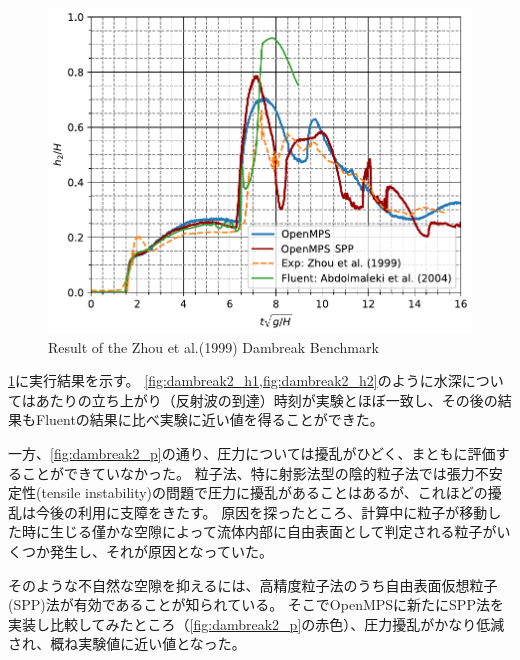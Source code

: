 \begin{figure}
\begin{minipage}{.3 \linewidth}
			\end{minipage}
			\begin{minipage}{.3 \linewidth} \centering
				\includegraphics[clip, width=\linewidth]{img/zhouetal1999_h2_2mm.pdf}
			\end{minipage}
			\caption{Result of the Zhou et al.(1999) Dambreak Benchmark \label{fig:result_dambreak2}}
		\end{figure}
		\cref{fig:result_dambreak2}に実行結果を示す。
		\cref{fig:dambreak2_h1,fig:dambreak2_h2}のように水深についてはあたりの立ち上がり（反射波の到達）時刻が実験とほぼ一致し、その後の結果もFluentの結果に比べ実験に近い値を得ることができた。

		一方、\cref{fig:dambreak2_p}の通り、圧力については擾乱がひどく、まともに評価することができていなかった。		
		粒子法、特に射影法型の陰的粒子法では張力不安定性(tensile instability)の問題で圧力に擾乱があることはあるが、これほどの擾乱は今後の利用に支障をきたす。
		原因を探ったところ、計算中に粒子が移動した時に生じる僅かな空隙によって流体内部に自由表面として判定される粒子がいくつか発生し、それが原因となっていた。
		
		そのような不自然な空隙を抑えるには、高精度粒子法のうち自由表面仮想粒子(SPP)法\Cite{ref:Tsuruta2015}が有効であることが知られている。
		そこでOpenMPSに新たにSPP法を実装し比較してみたところ（\cref{fig:dambreak2_p}の赤色）、圧力擾乱がかなり低減され、概ね実験値に近い値となった。

